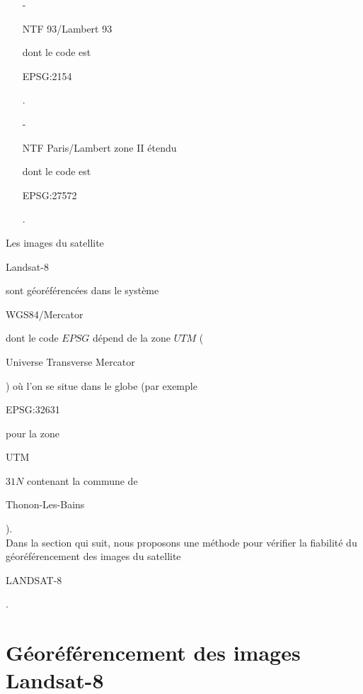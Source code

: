 \documentclass{book}
\begin{document}
\begin{itemize}

\item[-] \begin{itshape}NTF 93/Lambert 93\end{itshape} dont le code est \begin{itshape}EPSG:2154\end{itshape}.\\
\item[-] \begin{itshape}NTF Paris/Lambert zone II étendu\end{itshape} dont le code est \begin{itshape}EPSG:27572\end{itshape}.\\
 
\end{itemize}

Les images du satellite \begin{itshape}Landsat-8\end{itshape} sont géoréférencées dans le système 
\begin{itshape}WGS84/Mercator\end{itshape} dont le code $EPSG$ dépend
de la zone $UTM$ (\begin{itshape}Universe Transverse Mercator\end{itshape}) où l'on se situe dans le globe 
(par exemple \begin{itshape}EPSG:32631\end{itshape} pour la zone \begin{itshape}UTM\end{itshape} $31N$ contenant la commune de
 \begin{itshape}Thonon-Les-Bains\end{itshape}).\\ 
Dans la section qui suit, nous proposons une méthode pour vérifier la fiabilité du géoréférencement
 des images du satellite \begin{itshape}LANDSAT-8\end{itshape}.
 
\section{Géoréférencement des images Landsat-8}
\end{document}
